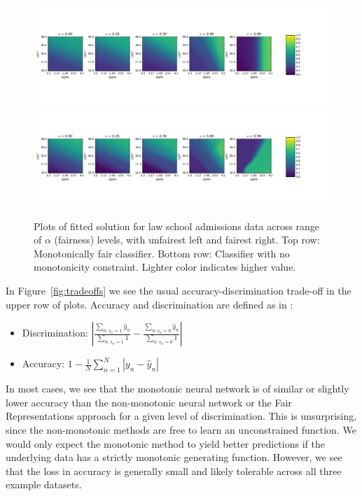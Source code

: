         \begin{figure}[h!]
          \centering
          \includegraphics[width=\linewidth,trim={0 3cm 0 3cm},clip]{fig_monofair/law_school_monotone_83_83.png}
          \includegraphics[width=\linewidth,trim={0 3cm 0 3cm},clip]{fig_monofair/law_school_non_monotone_83_83.png}
            \caption{Plots of fitted solution for law school admissions data across range of $\alpha$ (fairness) levels, with unfairest left and fairest right.  Top row: Monotonically fair classifier. Bottom row: Classifier with no monotonicity constraint. Lighter color indicates higher value.}
            \label{fig:fit_plots}
        \end{figure}

        In Figure~\ref{fig:tradeoffs} we see the usual accuracy-discrimination trade-off in the upper row of plots.  Accuracy and discrimination are defined as in \cite{ZemQiSwePitDwo2013}:
        \begin{itemize}
            \item Discrimination: $ \left|
                \frac{\sum_{n:s_n=1} \hat{y}_n}{\sum_{n:s_n=1} 1} -
                \frac{\sum_{n:s_n=0} \hat{y}_n}{\sum_{n:s_n=0} 1}
                \right| $
                \vspace{0.1in}
                
            \item Accuracy: $1 - \frac1N \sum_{n=1}^N |y_n - \hat{y}_n|$
        \end{itemize}
        
        In most cases, we see that the monotonic neural network is of similar or slightly lower accuracy than the non-monotonic neural network or the Fair Representations approach for a given level of discrimination.   This is unsurprising, since the non-monotonic methods are free to learn an unconstrained function.  We would only expect the monotonic method to yield better predictions if the underlying data has a strictly monotonic generating function.  However, we see that the loss in accuracy is generally small and likely tolerable across all three example datasets.
        

